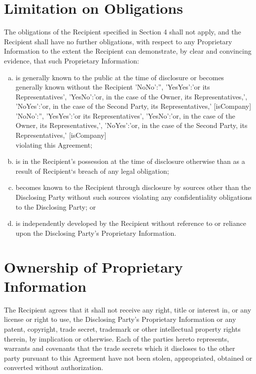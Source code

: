 \documentclass[10pt]{article}
\makeatletter
\edef\history{ }
\newcommand{\VAR}[1]{{\color{blue} #1}\g@addto@macro\history{#1\\}}
\newcommand{\representativesMention}[1]{
    \VAR{
        {
            'NoNo':'',
            'YesYes':'#1 its Representatives',
            'YesNo':'#1, in the case of the Owner, its Representatives,',
            'NoYes':'#1, in the case of the Second Party, its Representatives,'
        }[isCompany]
    }
}
\makeatother
\begin{document}
\section{Limitation on Obligations} \label{sec:limitOblig}
The obligations of the Recipient specified in Section 4 shall not apply, and the Recipient shall have no further obligations, with respect to any Proprietary Information to the extent the Recipient can demonstrate, by clear and convincing evidence, that such Proprietary Information:
\begin{enumerate}[a)]
\item is generally known to the public at the time of disclosure or becomes generally known without the Recipient \representativesMention{or} violating this Agreement;
\item  is in the Recipient’s possession at the time of disclosure otherwise than as a result of Recipient`s breach of any legal obligation;
\item becomes known to the Recipient through disclosure by sources other than the Disclosing Party without such sources violating any confidentiality obligations to the Disclosing Party; or
\item is independently developed by the Recipient without reference to or reliance upon the Disclosing Party's Proprietary Information.
\end{enumerate}

\section{Ownership of Proprietary Information}
The Recipient agrees that it shall not receive any right, title or interest in, or any license or right to use, the Disclosing Party's Proprietary Information or any patent, copyright, trade secret, trademark or other intellectual property rights therein, by implication or otherwise.
Each of the parties hereto represents, warrants and covenants that the trade secrets which it discloses to the other party pursuant to this Agreement have not been stolen, appropriated, obtained or converted without authorization.
\end{document}

